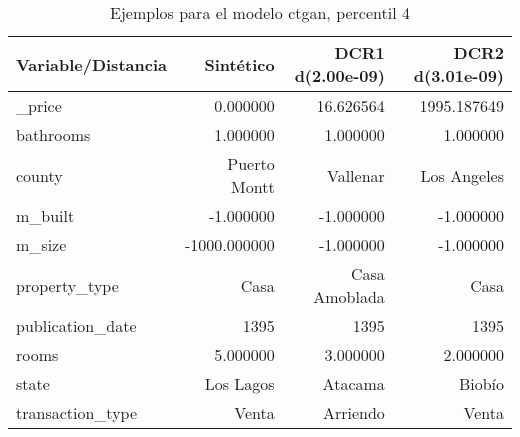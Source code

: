 \begin{table}[H]
\centering
\fontsize{10}{14}\selectfont
\caption{Ejemplos para el modelo ctgan, percentil 4}
\label{table-example-economicos-b-3-ctgan-4p}
\begin{tabular}{|l|r|r|r|}
\hline
\rowcolor[gray]{0.8}
Variable/Distancia & Sintético & DCR1 d(2.00e-09) & DCR2 d(3.01e-09) \\
\hline \_price & \cellcolor[rgb]{0.9, 0.54, 0.52} 0.000000 & 16.626564 & 1995.187649 \\
\hline bathrooms & \cellcolor[rgb]{0.9, 0.54, 0.52} 1.000000 & \cellcolor[rgb]{0.9, 0.54, 0.52} 1.000000 & \cellcolor[rgb]{0.9, 0.54, 0.52} 1.000000 \\
\hline county & \cellcolor[rgb]{0.9, 0.54, 0.52} Puerto Montt & Vallenar & Los Angeles \\
\hline m\_built & \cellcolor[rgb]{0.9, 0.54, 0.52} -1.000000 & \cellcolor[rgb]{0.9, 0.54, 0.52} -1.000000 & \cellcolor[rgb]{0.9, 0.54, 0.52} -1.000000 \\
\hline m\_size & \cellcolor[rgb]{0.9, 0.54, 0.52} -1000.000000 & \cellcolor[rgb]{0.9, 0.54, 0.52} -1.000000 & \cellcolor[rgb]{0.9, 0.54, 0.52} -1.000000 \\
\hline property\_type & \cellcolor[rgb]{0.9, 0.54, 0.52} Casa & Casa Amoblada & \cellcolor[rgb]{0.9, 0.54, 0.52} Casa \\
\hline publication\_date & \cellcolor[rgb]{0.9, 0.54, 0.52} 1395 & \cellcolor[rgb]{0.9, 0.54, 0.52} 1395 & \cellcolor[rgb]{0.9, 0.54, 0.52} 1395 \\
\hline rooms & \cellcolor[rgb]{0.9, 0.54, 0.52} 5.000000 & 3.000000 & 2.000000 \\
\hline state & \cellcolor[rgb]{0.9, 0.54, 0.52} Los Lagos & Atacama & Biobío \\
\hline transaction\_type & \cellcolor[rgb]{0.9, 0.54, 0.52} Venta & Arriendo & \cellcolor[rgb]{0.9, 0.54, 0.52} Venta \\
\hline
\end{tabular}
\end{table}
